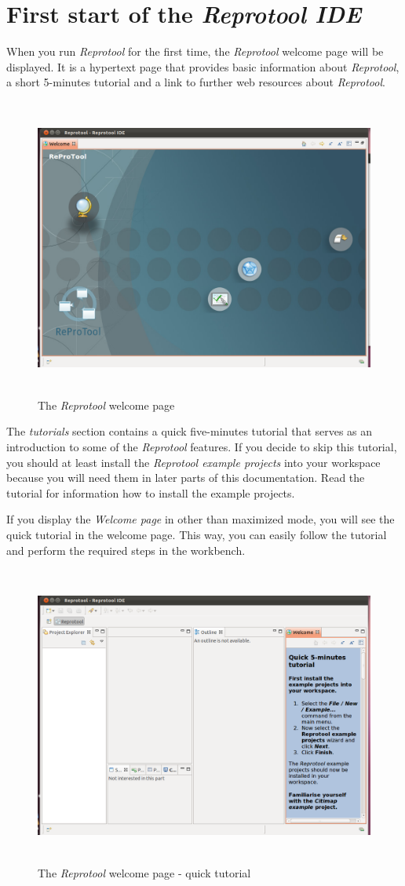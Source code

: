 \section{First start of the \emph{Reprotool IDE}}
When you run \emph{Reprotool} for the first time, the \emph{Reprotool} welcome page will be displayed. It is a hypertext page that
provides basic information about \emph{Reprotool}, a short 5-minutes tutorial and a link to further web resources about \emph{Reprotool}.

\begin{figure}[ht]
  \centering
  \includegraphics[height=280pt]{images/reprotoolWelcome}
  \caption{The \emph{Reprotool} welcome page}
  \label{fig:reprotoolWelcome}
\end{figure}

The \emph{tutorials} section contains a quick five-minutes tutorial that serves as an introduction to some of the \emph{Reprotool}
features. If you decide to skip this tutorial, you should at least install the \emph{Reprotool example projects} into your workspace
because you will need them in later parts of this documentation. Read the tutorial for information how to install the example projects.

If you display the \emph{Welcome page} in other than maximized mode, you will see the quick tutorial in the welcome page. This way, you
can easily follow the tutorial and perform the required steps in the workbench.

\begin{figure}[ht]
  \centering
  \includegraphics[height=280pt]{images/reprotoolWelcomeTutorial}
  \caption{The \emph{Reprotool} welcome page - quick tutorial}
  \label{fig:reprotoolWelcomeTutorial}
\end{figure}